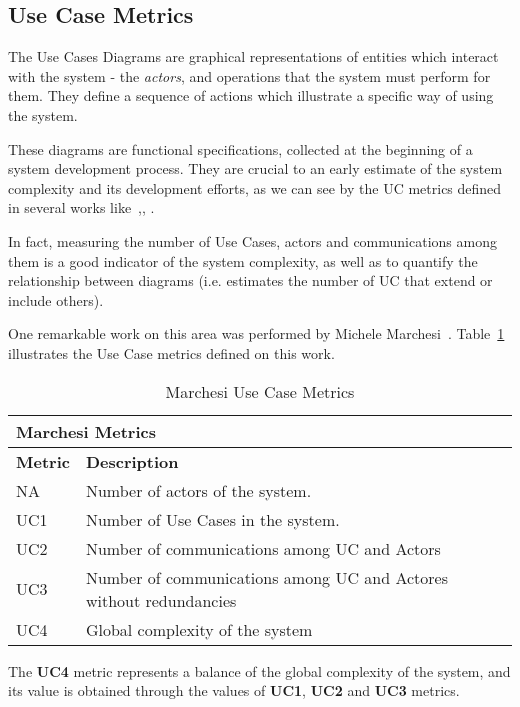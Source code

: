 \subsection{Use Case Metrics}

The Use Cases Diagrams are graphical representations of entities which interact with the system - the \emph{actors}, and operations that the system must perform for them.
They define a sequence of actions which illustrate a specific way of using the system.

These diagrams are functional specifications, collected at the beginning of a system development process.
They are crucial to an early estimate of the system complexity and its development efforts, as we can see by the UC metrics defined in several works like~\cite{Kim02developingsoftware},\cite{Mohagheghi05effortestimation}, \cite{Ribu01estimatingobject-oriented}.

In fact, measuring the number of Use Cases, actors and communications among them is a good indicator of the system complexity, as well as to quantify the relationship between diagrams (i.e. estimates the number of UC that extend or include others).

One remarkable work on this area was performed by Michele Marchesi~\cite{Marchesi:1998:OMU:522081.795010}.
Table~\ref{t:ucm} illustrates the Use Case metrics defined on this work. 
 
\begin{table}[h]\centering
\begin{tabular}{ p{} | p{10.5cm}}
\multicolumn{2}{l}{\textbf{Marchesi Metrics}} \\ \hline
\textbf{Metric} & \textbf{Description} \\ \hline
NA & Number of actors of the system. \\ \hline
UC1 & Number of Use Cases in the system. \\ \hline 
UC2 & Number of communications among UC and Actors  \\ \hline 
UC3 & Number of communications among UC and Actores without redundancies \\ \hline 
UC4 & Global complexity of the system \\ \hline 
\end{tabular}
\caption{\small{Marchesi Use Case Metrics}}
\label{t:ucm}
\end{table}

The \textbf{UC4} metric represents a balance of the global complexity of the system, and its value is obtained through the values of \textbf{UC1}, \textbf{UC2} and \textbf{UC3} metrics.
